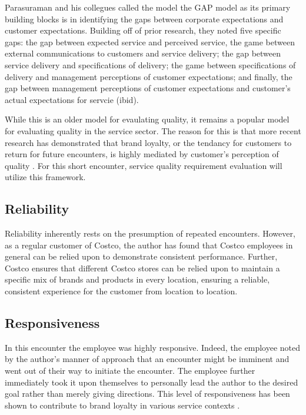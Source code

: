 \documentclass[man]{apa7}
\begin{document}
Parasuraman and his collegues called the model the GAP model as its primary building blocks is in identifying the gaps between corporate expectations and customer expectations. Building off of prior research, they noted five specific gaps: the gap between expected service and perceived service, the game between external communications to customers and service delivery; the gap between service delivery and specifications of delivery; the game between specifications of delivery and management perceptions of customer expectations; and finally, the gap between management perceptions of customer expectations and customer's actual expectations for servcie (ibid).

While this is an older model for evaulating quality, it remains a popular model for evaluating quality in the service sector. The reason for this is that more recent research has demonstrated that brand loyalty, or the tendancy for customers to return for future encounters, is highly mediated by customer's perception of quality \parencite{rizwanImpactPerceivedQuality2013}. For this short encounter, service quality requirement evaluation will utilize this framework.

\subsection{Reliability}
\label{sec:org62a7a3c}

Reliability inherently rests on the presumption of repeated encounters.  However, as a regular customer of Costco, the author has found that Costco employees in general can be relied upon to demonstrate consistent performance. Further, Costco ensures that different Costco stores can be relied upon to maintain a specific mix of brands and products in every location, ensuring a reliable, consistent experience for the customer from location to location.

\subsection{Responsiveness}
\label{sec:org4c0daf9}

In this encounter the employee was highly responsive. Indeed, the employee noted by the author's manner of approach that an encounter might be imminent and went out of their way to initiate the encounter. The employee further immediately took it upon themselves to personally lead the author to the desired goal rather than merely giving directions. This level of responsiveness has been shown to contribute to brand loyalty in various service contexts \parencite{murrayExaminingEmpathyResponsiveness2019}.
\end{document}
